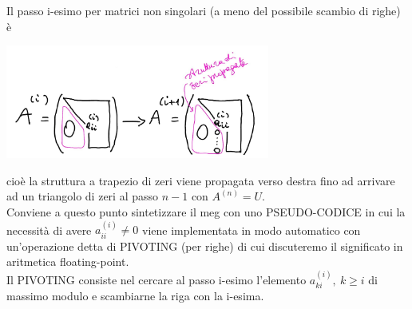 \documentclass[12pt,a4paper]{article}
\begin{document}
Il passo i-esimo per matrici non singolari (a meno del possibile scambio di righe) è
\begin{center}
    \includegraphics[width = 0.65\textwidth]{pag20.jpg}
\end{center}
cioè la struttura a trapezio di zeri viene propagata verso destra fino ad arrivare ad un triangolo di zeri al passo $n-1$ con $A^{(n)} = U$.\\
Conviene a questo punto sintetizzare il meg con uno PSEUDO-CODICE in cui la necessità di avere $a_{ii}^{(i)} \neq 0$ viene implementata in modo automatico con un'operazione detta di PIVOTING (per righe) di cui discuteremo il significato in aritmetica floating-point.\\
Il PIVOTING consiste nel cercare al passo i-esimo l'elemento $a_{ki}^{(i)}, \ k \ge i$ di massimo modulo e scambiarne la riga con la i-esima.
\end{document}
